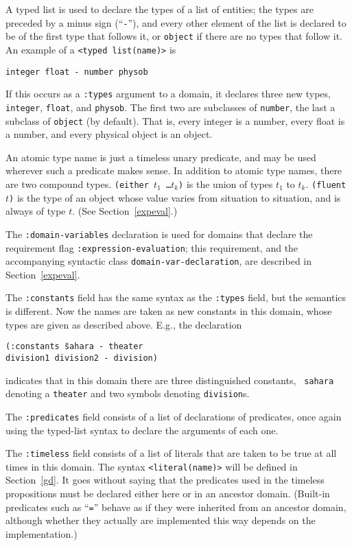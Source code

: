A typed list is used to declare the types of a list of entities; the types
are preceded by a minus sign (``{\tt -}''), and every other element of the list
is declared to be of the first type that follows it, or {\tt object} if there
are no types that follow it.
An example of a  {\tt <typed list(name)>} is 
\begin{center}
{\tt integer float - number physob}  
\end{center}
If this occurs as a 
{\tt :types} argument to a domain, it declares three new types, {\tt integer},
{\tt float}, and {\tt physob}.  The first two are subclasses of {\tt number},
the last a subclass of {\tt object} (by default).  That is, every integer
is a number, every float is a number, and every physical object is an object.

An atomic type name is just a timeless unary predicate, and may be used wherever such a 
predicate makes sense.  In addition to atomic type names, there are
two compound types.  {\tt (either $t_1$ \ldots $t_k$)} is the union of
types $t_1$ to $t_k$.  {\tt (fluent $t$)} is the type of an object
whose value varies from situation to situation, and is always of type
$t$.  (See Section~\ref{expeval}.)  

The {\tt :domain-variables} declaration is used for domains that
declare the requirement flag
{\tt :expression-evaluation}; this requirement, and the accompanying syntactic class
{\tt domain-var-declaration}, are described in Section~\ref{expeval}. 

The {\tt :constants} field has the same syntax as the {\tt :types} field, but
the semantics is different.  Now the names are taken as new constants in this
domain, whose types are given as described above.  E.g., the declaration
\begin{tabbing}
\bump \tt (:constants \= sahara - theater \\
                      \> division1 division2 - division)
\end{tabbing}
indicates that in this domain there are three distinguished constants, {\tt
sahara} denoting a {\tt theater} and two symbols denoting {\tt division}s.

The {\tt :predicates} field consists of a list of declarations of predicates,
once again using the typed-list syntax to declare the arguments of each one.

The {\tt :timeless} field consists of a list of literals that are taken to be
true at all times in this domain.  
The syntax {\tt <literal(name)>} will be defined in Section~\ref{gd}.  It
goes without saying that the predicates used in the timeless propositions
must be declared either here or in an ancestor domain.  (Built-in predicates
such as ``{\tt =}'' behave as if they were inherited from an ancestor
domain, although whether they actually are implemented this way
depends on the implementation.)

